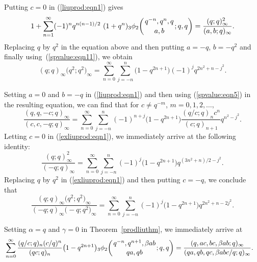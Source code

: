 \documentclass[pdftex]{sigma}
\numberwithin{equation}{section}
\begin{document}
Putting $c=0$ in (\ref{liuprod:eqn1}) gives
\begin{equation*}%
1+\sum_{n=1}^\infty (-1)^n q^{n(n-1)/2}~(1+q^n){_3 \phi_2} \biggl({{q^{-n}, q^n, q}
	\atop{ a, b}}; q, q\biggr)=\frac{(q; q)_\infty^2}{(a, b; q)_\infty}.
\end{equation*}
Replacing $q$ by $q^2$ in the equation above and then putting $a=-q$, $b=-q^2$ and finally using~(\ref{spvalue:eqn11}), we obtain \cite[equation~(1.7)]{Liu2002}
\begin{equation*}%
(q; q)_\infty \bigl(q^2; q^2\bigr)_\infty=\sum_{n=0}^\infty \sum_{j=-n}^n \bigl(1-q^{2n+1}\bigr)
(-1)^j q^{2n^2+n-j^2}.
\end{equation*}


Setting $a=0$ and $b=-q$ in (\ref{liuprod:eqn1}) and then using (\ref{spvalue:eqn5}) in the resulting equation, we can find that
 for $c\not=q^{-m}$, $m=0, 1, 2, \ldots,$
\begin{equation}\label{exliuprod:eqn1}
	\frac{(q, q, -c; q)_\infty}{(c, c, -q; q)_\infty}
	=\sum_{n=0}^\infty \sum_{j=-n}^n (-1)^{n+j} \bigl(1-q^{2n+1}\bigr)
	\frac{(q/c; q)_n c^n}{(c; q)_{n+1}} q^{n^2-j^2}.
\end{equation}
Letting $c=0$ in (\ref{exliuprod:eqn1}), we immediately arrive at the following identity:
\begin{equation*}%
	\frac{(q; q)^2_\infty}{(-q; q)_\infty}
	=\sum_{n=0}^\infty \sum_{j=-n}^n (-1)^j \bigl(1-q^{2n+1}\bigr) q^{(3n^2+n)/2-j^2}.
\end{equation*}
Replacing $q$ by $q^2$ in (\ref{exliuprod:eqn1}) and then putting $c=-q$, we conclude that
\begin{equation*}%
	\frac{(q; q)_\infty \bigl(q^2; q^2\bigr)_\infty}{(-q; q)_\infty \bigl(-q; q^2\bigr)_\infty}
	=\sum_{n=0}^\infty \sum_{j=-n}^n (-1)^j \bigl(1-q^{2n+1}\bigr)
	q^{2n^2+n-2j^2}.
\end{equation*}


Setting $\alpha=q$ and $\gamma=0$ in Theorem~\ref{prodliuthm}, we immediately arrive at
\begin{align} \label{liuprod:eqn15}
&\sum_{n=0}^\infty \frac{(q/c; q)_n (c/q)^n}{(qc; q)_n} \bigl(1-q^{2n+1}\bigr)
{_3\phi_2} \biggl({{q^{-n}, q^{n+1}, \beta ab}\atop{qa, qb}}; q, q\biggr)
=\frac{(q, ac, bc, \beta ab; q)_\infty}{(qa, qb, qc, \beta abc/q; q)_\infty}.
\end{align}
\end{document}
